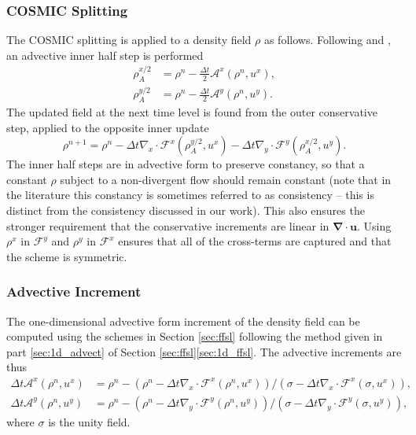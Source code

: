 \documentclass{ametsocV6.1}
\begin{document}
\subsubsection{COSMIC Splitting} \label{sec:cosmic_density}
The COSMIC splitting is applied to a density field $\rho$ as follows.
Following \citet{leonard1996cosmic} and \citet{lin1996ffsl}, an advective inner half step is performed
\begin{subequations}
\begin{align}
    \rho_A^{x/2} &= \rho^n - \frac{\Delta{t}}{2} \mathcal{A}^x(\rho^n, u^x), \\
    \rho_A^{y/2} &= \rho^n - \frac{\Delta{t}}{2} \mathcal{A}^y(\rho^n, u^y).
\end{align}
\end{subequations}
The updated field at the next time level is found from the outer conservative step, applied to the opposite inner update
\begin{equation} \label{eqn:cosmic_density}
    \rho^{n+1} = \rho^{n} - \Delta{t} \nabla_x\cdot \mathcal{F}^x(\rho_A^{y/2},u^x) - \Delta{t} \nabla_y \cdot \mathcal{F}^y(\rho_A^{x/2},u^y).
\end{equation}
The inner half steps are in advective form to preserve constancy, so that a constant $\rho$ subject to a non-divergent flow should remain constant (note that in the literature this constancy is sometimes referred to as consistency -- this is distinct from the consistency discussed in our work). This also ensures the stronger requirement that the conservative increments are linear in $\bm{\nabla\cdot u}$. Using $\rho^x$ in $\mathcal{F}^y$ and $\rho^y$ in $\mathcal{F}^x$ ensures that all of the cross-terms are captured \citep{kent2019crossterms} and that the scheme is symmetric. 

\subsubsection{Advective Increment} \label{sec:advective_increment}

The one-dimensional advective form increment of the density field can be computed using the schemes in Section \ref{sec:ffsl} following the method given in part \ref{sec:1d_advect} of Section \ref{sec:ffsl}\ref{sec:1d_ffsl}. The advective increments are thus
\begin{subequations} \label{eqn:advective_operators}
\begin{align}
    \Delta{t} \mathcal{A}^x(\rho^n, u^x) &= \rho^n - \left( \rho^n - \Delta{t} \nabla_x\cdot \mathcal{F}^x(\rho^n,u^x)\right)/\left( \sigma - \Delta{t} \nabla_x\cdot \mathcal{F}^x(\sigma,u^x)\right), \\
    \Delta{t} \mathcal{A}^y(\rho^n, u^y) &= \rho^n - \left( \rho^n - \Delta{t} \nabla_y\cdot \mathcal{F}^y(\rho^n,u^y)\right)/\left( \sigma - \Delta{t} \nabla_y\cdot \mathcal{F}^y(\sigma,u^y)\right),
\end{align}
\end{subequations}
where $\sigma$ is the unity field.
\end{document}
